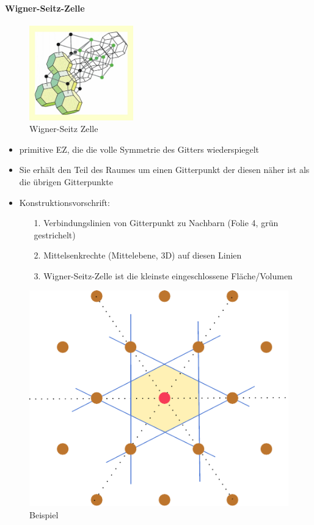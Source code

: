 \paragraph{Wigner-Seitz-Zelle}
\begin{figure}[H]
    \centering
    \includegraphics[width=0.4\textwidth]{figures/2_1wignerseitz.jpg}
    \caption{Wigner-Seitz Zelle}
    \label{}
\end{figure}
\begin{itemize}
    \item primitive EZ, die die volle Symmetrie des Gitters wiederspiegelt
    \item Sie erhält den Teil des Raumes um einen Gitterpunkt der diesen näher ist als die übrigen Gitterpunkte
    \item Konstruktionsvorschrift:
          \begin{itemize}
              \item[1.] Verbindungslinien von Gitterpunkt zu Nachbarn (Folie 4, grün gestrichelt)
              \item[2.] Mittelsenkrechte (Mittelebene, 3D) auf diesen Linien
              \item[3.] Wigner-Seitz-Zelle ist die kleinste eingeschlossene Fläche/Volumen
          \end{itemize}
\end{itemize}
\begin{figure}[H]
    \centering
    \includegraphics{figures/2_1Gitter.pdf}
    \caption{Beispiel}
    \label{}
\end{figure}
